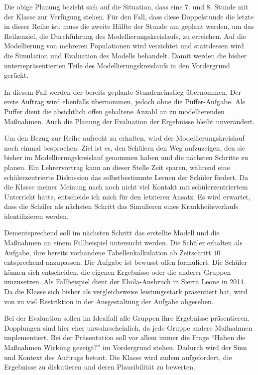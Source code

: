 Die obige Planung bezieht sich auf die Situation, dass eine 7. und 8. Stunde mit der Klasse zur Verfügung stehen. Für den Fall, dass diese Doppelstunde die letzte in dieser Reihe ist, muss die zweite Hälfte der Stunde um geplant werden, um das Reihenziel, die Durchführung des Modellierungskreislaufs, zu erreichen. Auf die Modellierung von mehreren Populationen wird verzichtet und stattdessen wird die Simulation und Evaluation des Modells behandelt. Damit werden die bisher unterrepräsentierten Teile des Modellierungskreislaufs in den Vordergrund gerückt.

In diesem Fall werden der bereits geplante Stundeneinstieg übernommen. Der erste Auftrag wird ebenfalls übernommen, jedoch ohne die Puffer-Aufgabe. Als Puffer dient die absichtlich offen gehaltene Anzahl an zu modellierenden Maßnahmen. Auch die Planung der Evaluation der Ergebnisse bleibt unverändert. 

Um den Bezug zur Reihe aufrecht zu erhalten, wird der Modellierungskreislauf noch einmal besprochen. Ziel ist es, den Schülern den Weg aufzuzeigen, den sie bisher im Modellierungskreislauf genommen haben und die nächsten Schritte zu planen. Ein Lehrervortrag kann an dieser Stelle Zeit sparen, während eine schülerzentrierte Diskussion das selbstbestimmte Lernen der Schüler fördert. Da die Klasse meiner Meinung nach noch nicht viel Kontakt mit schülerzentriertem Unterricht hatte, entscheide ich mich für den letzteren Ansatz. Es wird erwartet, dass die Schüler als nächsten Schritt das Simulieren eines Krankheitsverlaufs identifizieren werden. 

Dementsprechend soll im nächsten Schritt das erstellte Modell und die Maßnahmen an einem Fallbeispiel untersucht werden. Die Schüler erhalten als Aufgabe, ihre bereits vorhandene Tabellenkalkulation ab Zeitschritt $10$ entsprechend anzupassen. Die Aufgabe ist bewusst offen formuliert. Die Schüler können sich entscheiden, die eigenen Ergebnisse oder die anderer Gruppen umzusetzen. Als Fallbeispiel dient der Ebola-Ausbruch in Sierra Leone in 2014. Da die Klasse sich bisher als vergleichsweise leistungsstark präsentiert hat, wird von zu viel Restriktion in der Ausgestaltung der Aufgabe abgesehen. 

Bei der Evaluation sollen im Idealfall alle Gruppen ihre Ergebnisse präsentieren. Dopplungen sind hier eher unwahrscheinlich, da jede Gruppe andere Maßnahmen implementiert. Bei der Präsentation soll vor allem immer die Frage ``Haben die Maßnahmen Wirkung gezeigt?'' im Vordergrund stehen. Dadurch wird der Sinn und Kontext des Auftrags betont. Die Klasse wird zudem aufgefordert, die Ergebnisse zu diskutieren und deren Plausibilität zu bewerten. 

